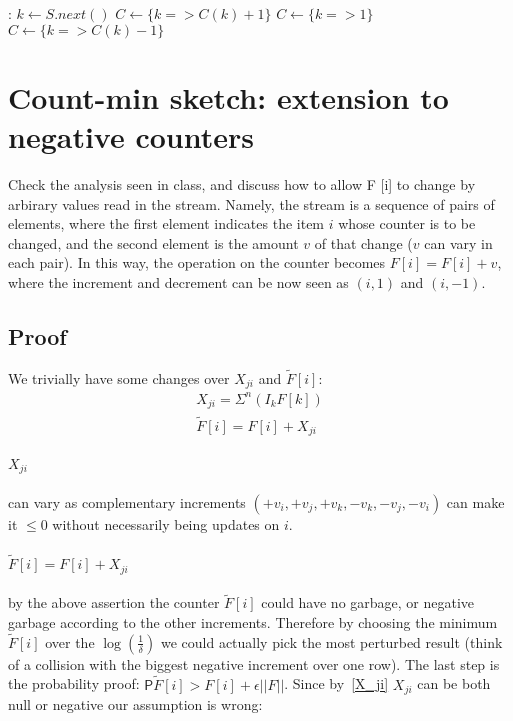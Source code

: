 \documentclass{article}
\newcommand*{\prob}{\mathsf{P}}    %
\begin{document}
\begin{algorithmic}[1]
  :
    \State $k \gets S.next()$\;
        \State $C \gets \{k => C(k) + 1\}$\;    
        \State $C \gets \{k => 1\}$\;           
    \Else
        \State $C \gets \{k => C(k) - 1\}$      
    \EndIf
    \State {}\;
    \EndFunction
\end{algorithmic}


\newpage
\section{Count-min sketch: extension to negative counters}

Check the analysis seen in class, and discuss how to allow F [i] to change by arbirary
values read in the stream.
Namely, the stream is a sequence of pairs of elements, where the first element indicates the
item $i$ whose counter is to be changed, and the second element is the amount $v$ of that
change ($v$ can vary in each pair).
In this way, the operation on the counter becomes $F[i] = F[i] + v$, where the increment
and decrement can be now seen as $(i, 1)$ and $(i, -1)$.

\subsection{Proof}

We trivially have some changes over $X_{ji}$ and $\tilde{F}[i]$:
    \begin{gather*}
        X_{ji} = \Sigma^{n}(I_k F[k]) \\
        \tilde{F}[i] = F[i] + X_{ji}
    \end{gather*}
\label{X_ji}\paragraph{$X_{ji}$} can vary as complementary increments $(+v_i, +v_j, +v_k, -v_k, -v_j, -v_i)$
can make it $\leq 0$ without necessarily being updates on $i$.
\label{f_tilde}~\paragraph{$\tilde{F}[i] = F[i] + X_{ji}$} by the above assertion the counter $\tilde{F}[i]$ could have no garbage, or negative
garbage according to the other increments.
Therefore by choosing the minimum $\tilde{F}[i]$ over the $\log(\frac{1}{\delta})$ we
could actually pick the most perturbed result (think of a collision with the
biggest negative increment over one row).
The last step is the probability proof: $\prob{\tilde{F}[i] > F[i] + \epsilon ||F||}$.
Since by~\ref{X_ji} $X_{ji}$ can be both null or negative our assumption is wrong:
\end{document}
